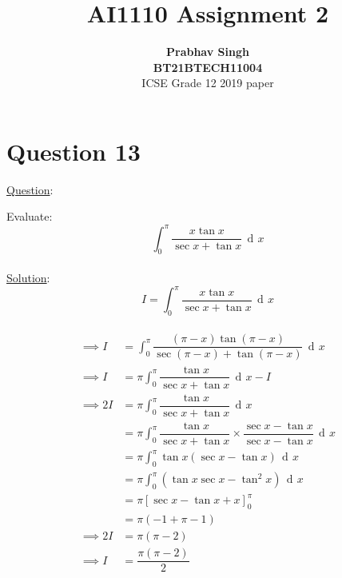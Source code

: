 \documentclass[journal,12pt,twocolumn]{IEEEtran}
\DeclareMathOperator{\di}{d\!}
\begin{document}
	\title{\textbf{AI1110 Assignment 2} }
	\author{\textbf{Prabhav Singh}\\\textbf{BT21BTECH11004}\\ ICSE Grade 12 2019 paper}
	\maketitle
	
	{\section*{Question 13}}
	
	{\large \underline{Question}:\newline}
	
	Evaluate:
	\begin{equation}
		\int_{0}^{{\pi}} \dfrac{x \tan x}{\sec x + \tan x } \,\di x 
	\end{equation}\\
	
	{\large \underline{Solution}:}\\
	 	\begin{equation}
	 I=	\int_{0}^{{\pi}} \dfrac{x \tan x}{\sec x + \tan x } \,\di x 
	 \end{equation}\\
	\begin{align}
     \implies I &=	\int_{0}^{{\pi}} \dfrac{({\pi-x})\tan({\pi-x})}{\sec({\pi-x})  + \tan ({\pi-x}) } \,\di x   \\
	\implies I 	&= {\pi}\int_{0}^{{\pi}} \dfrac{\tan x}{\sec x  + \tan x } \,\di x  -I \\
	\implies 2I	&=  {\pi}\int_{0}^{{\pi}} \dfrac{\tan x}{\sec x  + \tan x } \,\di x \\
	        	&=  {\pi}\int_{0}^{{\pi}} \dfrac{\tan x}{\sec x  + \tan x } \times\dfrac{\sec x -\tan x}{\sec x -\tan x}\,\di x  \\
	        	&= {\pi}\int_{0}^{{\pi}} \tan x(\sec x-\tan x)\,\di x\\
	        	&=  {\pi}\int_{0}^{{\pi}}( \tan x\sec x-\tan^2 x)\,\di x\\
	        	&={\pi} \left[\sec x -\tan x +x \right]^{\pi}_{0}\\
	        	&= {\pi}(-1+{\pi}-1)\\
	\implies 2I &={\pi}({\pi}-2) \\
	\implies I  &= \dfrac{{\pi}({\pi}-2)}{2}      	
		\end{align}
	
\end{document}
